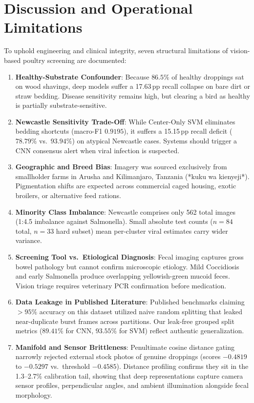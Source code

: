 \documentclass[conference]{IEEEtran}
\begin{document}
\section{Discussion and Operational Limitations}
To uphold engineering and clinical integrity, seven structural limitations of vision-based poultry screening are documented:
\begin{enumerate}\setlength{\itemsep}{0.4pt}\setlength{\parskip}{0pt}\setlength{\parsep}{0pt}
    \item \textbf{Healthy-Substrate Confounder}: Because $86.5\%$ of healthy droppings sat on wood shavings, deep models suffer a 17.63\,pp recall collapse on bare dirt or straw bedding. Disease sensitivity remains high, but clearing a bird as healthy is partially substrate-sensitive.
    \item \textbf{Newcastle Sensitivity Trade-Off}: While Center-Only SVM eliminates bedding shortcuts (macro-F1 $0.9195$), it suffers a 15.15\,pp recall deficit ($78.79\%$ vs.\ $93.94\%$) on atypical Newcastle cases. Systems should trigger a CNN consensus alert when viral infection is suspected.
    \item \textbf{Geographic and Breed Bias}: Imagery was sourced exclusively from smallholder farms in Arusha and Kilimanjaro, Tanzania (*kuku wa kienyeji*). Pigmentation shifts are expected across commercial caged housing, exotic broilers, or alternative feed rations.
    \item \textbf{Minority Class Imbalance}: Newcastle comprises only 562 total images (1:4.5 imbalance against Salmonella). Small absolute test counts ($n=84$ total, $n=33$ hard subset) mean per-cluster viral estimates carry wider variance.
    \item \textbf{Screening Tool vs.\ Etiological Diagnosis}: Fecal imaging captures gross bowel pathology but cannot confirm microscopic etiology. Mild Coccidiosis and early Salmonella produce overlapping yellowish-green mucoid feces. Vision triage requires veterinary PCR confirmation before medication.
    \item \textbf{Data Leakage in Published Literature}: Published benchmarks claiming $>95\%$ accuracy on this dataset utilized naive random splitting that leaked near-duplicate burst frames across partitions. Our leak-free grouped split metrics ($89.41\%$ for CNN, $93.55\%$ for SVM) reflect authentic generalization.
    \item \textbf{Manifold and Sensor Brittleness}: Penultimate cosine distance gating narrowly rejected external stock photos of genuine droppings (scores $-0.4819$ to $-0.5297$ vs.\ threshold $-0.4585$). Distance profiling confirms they sit in the 1.3--2.7\% calibration tail, showing that deep representations capture camera sensor profiles, perpendicular angles, and ambient illumination alongside fecal morphology.
\end{enumerate}
\end{document}
